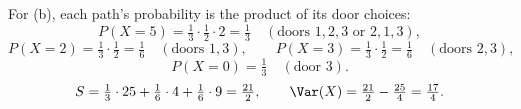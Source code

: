 \documentclass[11pt]{article}
\begin{document}
For (b), each path's probability is the product of its door choices:
\[
  P(X=5) = \tfrac13\cdot\tfrac12\cdot 2 = \tfrac13 \quad (\text{doors } 1,2,3 \text{ or } 2,1,3),
\]
\[
  P(X=2) = \tfrac13\cdot\tfrac12 = \tfrac16 \quad (\text{doors } 1,3), \qquad
  P(X=3) = \tfrac13\cdot\tfrac12 = \tfrac16 \quad (\text{doors } 2,3),
\]
\[
  P(X=0) = \tfrac13 \quad (\text{door } 3).
\]
\[
  S = \tfrac13\cdot 25 + \tfrac16\cdot 4 + \tfrac16\cdot 9 = \tfrac{21}{2},
  \qquad
  \Var(X) = \tfrac{21}{2} - \tfrac{25}{4} = \tfrac{17}{4}.
\]
\end{document}
